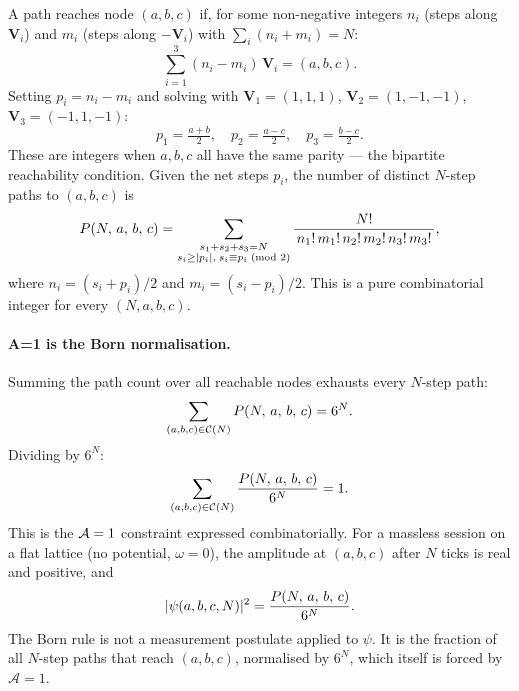 A path reaches node $(a, b, c)$ if, for some non-negative integers
$n_i$ (steps along $\mathbf{V}_i$) and $m_i$ (steps along $-\mathbf{V}_i$)
with $\sum_i(n_i + m_i) = N$:
\begin{equation}
    \sum_{i=1}^{3} (n_i - m_i)\,\mathbf{V}_i = (a,b,c).
    \label{eq:path_constraint}
\end{equation}
Setting $p_i = n_i - m_i$ and solving with $\mathbf{V}_1 = (1,1,1)$,
$\mathbf{V}_2 = (1,-1,-1)$, $\mathbf{V}_3 = (-1,1,-1)$:
\begin{equation}
    p_1 = \tfrac{a+b}{2}, \quad
    p_2 = \tfrac{a-c}{2}, \quad
    p_3 = \tfrac{b-c}{2}.
    \label{eq:net_steps}
\end{equation}
These are integers when $a, b, c$ all have the same parity --- the
bipartite reachability condition.
Given the net steps $p_i$, the number of distinct $N$-step paths to
$(a,b,c)$ is
\begin{equation}
    P(N,\,a,\,b,\,c)
    = \sum_{\substack{s_1+s_2+s_3=N \\ s_i \geq |p_i|,\;
           s_i \equiv p_i \!\pmod{2}}}
      \frac{N!}{\,n_1!\,m_1!\,n_2!\,m_2!\,n_3!\,m_3!\,},
    \label{eq:path_count}
\end{equation}
where $n_i = (s_i + p_i)/2$ and $m_i = (s_i - p_i)/2$.
This is a pure combinatorial integer for every $(N, a, b, c)$.

\paragraph{A=1 is the Born normalisation.}
Summing the path count over all reachable nodes exhausts every $N$-step path:
\begin{equation}
    \sum_{(a,b,c) \in \mathcal{C}(N)} P(N,\,a,\,b,\,c) = 6^N.
    \label{eq:path_partition}
\end{equation}
Dividing by $6^N$:
\begin{equation}
    \sum_{(a,b,c) \in \mathcal{C}(N)} \frac{P(N,\,a,\,b,\,c)}{6^N} = 1.
    \label{eq:born_normalisation}
\end{equation}
This is the $\mathcal{A}=1$ constraint expressed combinatorially.
For a massless session on a flat lattice (no potential, $\omega = 0$), the
amplitude at $(a,b,c)$ after $N$ ticks is real and positive, and
\begin{equation}
    |\psi(a,b,c,N)|^2 = \frac{P(N,\,a,\,b,\,c)}{6^N}.
    \label{eq:born_identity}
\end{equation}
The Born rule is not a measurement postulate applied to $\psi$.
It is the fraction of all $N$-step paths that reach $(a,b,c)$, normalised
by $6^N$, which itself is forced by $\mathcal{A} = 1$.

